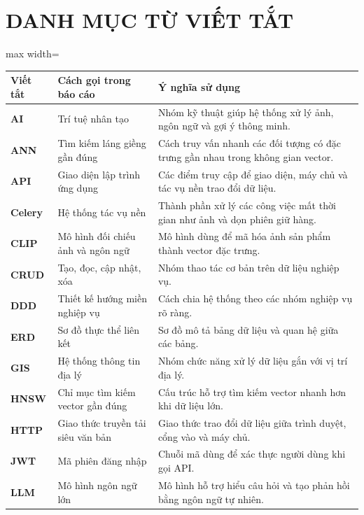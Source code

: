 \documentclass[12pt, a4paper]{article}
\begin{document}
\section*{DANH MỤC TỪ VIẾT TẮT}
\begin{table}[H]
\centering
\renewcommand{\arraystretch}{1.2}
\small
\begin{adjustbox}{max width=\textwidth}
\begin{tabular}{|p{2.0cm}|p{5.5cm}|p{6.5cm}|}
\hline
\textbf{Viết tắt} & \textbf{Cách gọi trong báo cáo} & \textbf{Ý nghĩa sử dụng} \\ \hline
\textbf{AI} & Trí tuệ nhân tạo & Nhóm kỹ thuật giúp hệ thống xử lý ảnh, ngôn ngữ và gợi ý thông minh. \\ \hline
\textbf{ANN} & Tìm kiếm láng giềng gần đúng & Cách truy vấn nhanh các đối tượng có đặc trưng gần nhau trong không gian vector. \\ \hline
\textbf{API} & Giao diện lập trình ứng dụng & Các điểm truy cập để giao diện, máy chủ và tác vụ nền trao đổi dữ liệu. \\ \hline
\textbf{Celery} & Hệ thống tác vụ nền & Thành phần xử lý các công việc mất thời gian như ảnh và dọn phiên giữ hàng. \\ \hline
\textbf{CLIP} & Mô hình đối chiếu ảnh và ngôn ngữ & Mô hình dùng để mã hóa ảnh sản phẩm thành vector đặc trưng. \\ \hline
\textbf{CRUD} & Tạo, đọc, cập nhật, xóa & Nhóm thao tác cơ bản trên dữ liệu nghiệp vụ. \\ \hline
\textbf{DDD} & Thiết kế hướng miền nghiệp vụ & Cách chia hệ thống theo các nhóm nghiệp vụ rõ ràng. \\ \hline
\textbf{ERD} & Sơ đồ thực thể liên kết & Sơ đồ mô tả bảng dữ liệu và quan hệ giữa các bảng. \\ \hline
\textbf{GIS} & Hệ thống thông tin địa lý & Nhóm chức năng xử lý dữ liệu gắn với vị trí địa lý. \\ \hline
\textbf{HNSW} & Chỉ mục tìm kiếm vector gần đúng & Cấu trúc hỗ trợ tìm kiếm vector nhanh hơn khi dữ liệu lớn. \\ \hline
\textbf{HTTP} & Giao thức truyền tải siêu văn bản & Giao thức trao đổi dữ liệu giữa trình duyệt, cổng vào và máy chủ. \\ \hline
\textbf{JWT} & Mã phiên đăng nhập & Chuỗi mã dùng để xác thực người dùng khi gọi API. \\ \hline
\textbf{LLM} & Mô hình ngôn ngữ lớn & Mô hình hỗ trợ hiểu câu hỏi và tạo phản hồi bằng ngôn ngữ tự nhiên. \\ \hline

\end{tabular}
\end{adjustbox}
\end{table}
\end{document}
